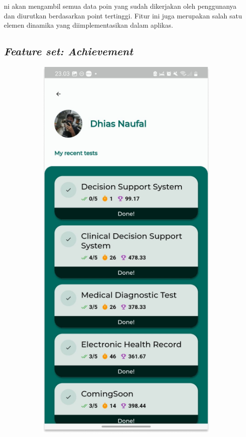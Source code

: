 ni akan mengambil semua data poin yang sudah dikerjakan oleh penggunanya dan diurutkan berdasarkan point tertinggi.
Fitur ini juga merupakan salah satu elemen dinamika yang diimplementasikan dalam aplikas.
\subsection{\textit{Feature set: Achievement}}
\begin{figure}[H]
	\centering
	\begin{subfigure}[b]{0.23\textwidth}
		\centering
	  \includegraphics[width=\linewidth]{contents/chapter-3/images/HF-profil.png}

\end{subfigure}
\end{figure}

